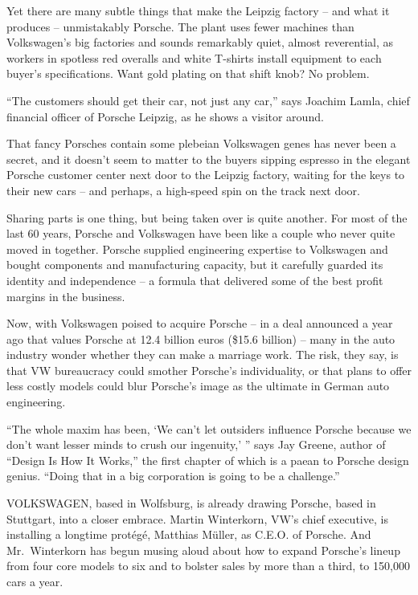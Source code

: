 ﻿\documentclass[12pt]{article}
\begin{document}
Yet there are many subtle things that make the Leipzig factory -- and what it produces --
unmistakably Porsche. The plant uses fewer machines than Volkswagen's big factories and sounds
remarkably quiet, almost reverential, as workers in spotless red overalls and white T-shirts install
equipment to each buyer's specifications. Want gold plating on that shift knob? No problem.

``The customers should get their car, not just any car,'' says Joachim Lamla, chief financial
officer of Porsche Leipzig, as he shows a visitor around.

That fancy Porsches contain some plebeian Volkswagen genes has never been a secret, and it doesn't
seem to matter to the buyers sipping espresso in the elegant Porsche customer center next door to
the Leipzig factory, waiting for the keys to their new cars -- and perhaps, a high-speed spin on the
track next door.

Sharing parts is one thing, but being taken over is quite another. For most of the last 60 years,
Porsche and Volkswagen have been like a couple who never quite moved in together. Porsche supplied
engineering expertise to Volkswagen and bought components and manufacturing capacity, but it
carefully guarded its identity and independence -- a formula that delivered some of the best profit
margins in the business.

Now, with Volkswagen poised to acquire Porsche -- in a deal announced a year ago that values Porsche
at 12.4 billion euros (\$15.6 billion) -- many in the auto industry wonder whether they can make a
marriage work. The risk, they say, is that VW bureaucracy could smother Porsche's individuality, or
that plans to offer less costly models could blur Porsche's image as the ultimate in German auto
engineering.

``The whole maxim has been, `We can't let outsiders influence Porsche because we don't want lesser
minds to crush our ingenuity,' '' says Jay Greene, author of ``Design Is How It Works,'' the first
chapter of which is a paean to Porsche design genius. ``Doing that in a big corporation is going to
be a challenge.''

VOLKSWAGEN, based in Wolfsburg, is already drawing Porsche, based in Stuttgart, into a closer
embrace. Martin Winterkorn, VW's chief executive, is installing a longtime prot\'eg\'e, Matthias
Müller, as C.E.O. of Porsche. And Mr.~Winterkorn has begun musing aloud about how to expand
Porsche's lineup from four core models to six and to bolster sales by more than a third, to 150,000
cars a year.
\end{document}
